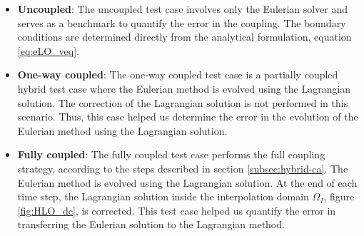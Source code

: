 \begin{itemize}
\item \textbf{Uncoupled}: The uncoupled test case involves only the Eulerian solver and serves as a benchmark to quantify the error in the coupling. The boundary conditions are determined directly from the analytical formulation, equation \ref{eq:eLO_veq}.
\item \textbf{One-way coupled}: The one-way coupled test case is a partially coupled hybrid test case where the Eulerian method is evolved using the Lagrangian solution. The correction of the Lagrangian solution is not performed in this scenario. Thus, this case helped us determine the error in the evolution of the Eulerian method using the Lagrangian solution.
\item \textbf{Fully coupled}: The fully coupled test case performs the full coupling strategy, according to the steps described in section \ref{subsec:hybrid-ca}. The Eulerian method is evolved using the Lagrangian solution. At the end of each time step, the Lagrangian solution inside the interpolation domain $\Omega_{I}$, figure \ref{fig:HLO_dc}, is corrected. This test case helped us quantify the error in transferring the Eulerian solution to the Lagrangian method.
\end{itemize}
	
